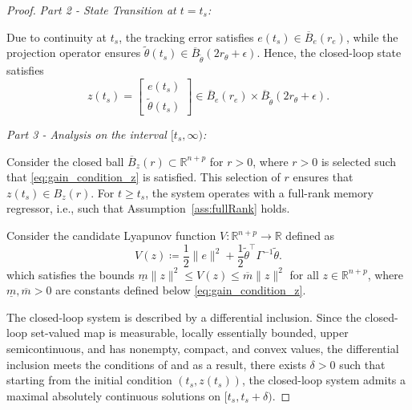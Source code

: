 \documentclass[conference]{ieeeconf}
\begin{document}
\begin{proof}
\textit{Part 2 - State Transition at $t = t_{s}$:}

Due to continuity at $t_{s}$, the tracking error satisfies $e(t_{s}) \in \overline{B}_e(r_e)$, while the projection operator ensures $\tilde{\theta}(t_{s}) \in \overline{B}_{\tilde{\theta}}(2 r_{\theta} + \epsilon)$. Hence, the closed-loop state satisfies
\begin{equation}
z(t_{s}) = \begin{bmatrix} e(t_{s}) \\ \tilde{\theta}(t_{s}) \end{bmatrix} \in \overline{B}_e(r_e) \times \overline{B}_{\tilde{\theta}}(2 r_{\theta} + \epsilon).
\end{equation}
 

\textit{Part 3 - Analysis on the interval $[t_{s}, \infty)$:}

Consider the closed ball $\overline{B}_z(r)\subset\mathbb{R}^{n+p}$ for $r>0$,
where $r>0$ is selected such that \eqref{eq:gain_condition_z} is satisfied. This selection of $r$ ensures that $z(t_s) \in B_z(r)$. For $t \geq t_{s}$, the system operates with a full-rank memory regressor, i.e., such that Assumption~\ref {ass:fullRank} holds.

Consider the candidate Lyapunov function $V: \mathbb{R}^{n + p} \to \mathbb{R}$ defined as
\begin{equation}\label{eq:V}
V(z) \coloneqq \frac{1}{2}\|e\|^2 + \frac{1}{2} \tilde{\theta}^{\top} \Gamma^{-1} \tilde{\theta}.
\end{equation}
which satisfies the bounds $\underline{m}\|z\|^2 \le V(z) \le \overline{m}\|z\|^2$ for all $z \in \mathbb{R}^{n + p}$, where $\underline{m}, \overline{m} > 0$ are constants defined below \eqref{eq:gain_condition_z}.

The closed-loop system is described by a differential inclusion. Since the closed-loop set-valued map is measurable, locally essentially bounded, upper semicontinuous, and has nonempty, compact, and convex values, the differential inclusion meets the conditions of \cite[Chap.~2, Thm.~1]{SCC.Aubin.Cellina1984} and as a result, there exists $\delta > 0$ such that starting from the initial condition $(t_s,z(t_s))$, the closed-loop system admits a maximal absolutely continuous solutions on $[t_s,t_s+\delta)$.


\end{proof}
\end{document}
